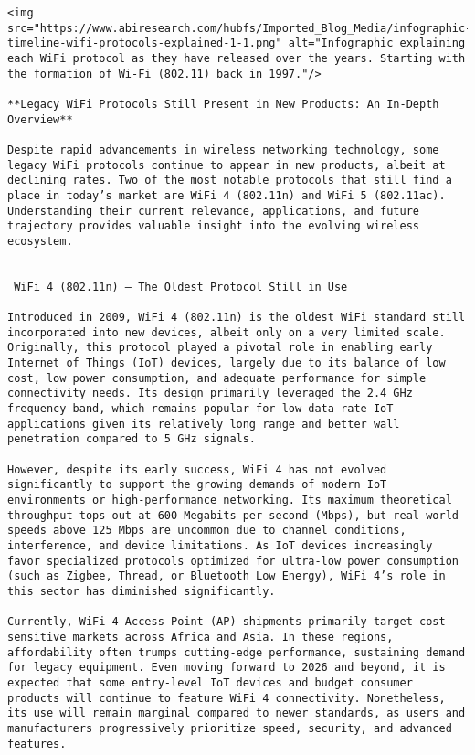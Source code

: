 \begin{verbatim}
<img src="https://www.abiresearch.com/hubfs/Imported_Blog_Media/infographic-timeline-wifi-protocols-explained-1-1.png" alt="Infographic explaining each WiFi protocol as they have released over the years. Starting with the formation of Wi-Fi (802.11) back in 1997."/>

**Legacy WiFi Protocols Still Present in New Products: An In-Depth Overview**

Despite rapid advancements in wireless networking technology, some legacy WiFi protocols continue to appear in new products, albeit at declining rates. Two of the most notable protocols that still find a place in today’s market are WiFi 4 (802.11n) and WiFi 5 (802.11ac). Understanding their current relevance, applications, and future trajectory provides valuable insight into the evolving wireless ecosystem.


 WiFi 4 (802.11n) – The Oldest Protocol Still in Use

Introduced in 2009, WiFi 4 (802.11n) is the oldest WiFi standard still incorporated into new devices, albeit only on a very limited scale. Originally, this protocol played a pivotal role in enabling early Internet of Things (IoT) devices, largely due to its balance of low cost, low power consumption, and adequate performance for simple connectivity needs. Its design primarily leveraged the 2.4 GHz frequency band, which remains popular for low-data-rate IoT applications given its relatively long range and better wall penetration compared to 5 GHz signals.

However, despite its early success, WiFi 4 has not evolved significantly to support the growing demands of modern IoT environments or high-performance networking. Its maximum theoretical throughput tops out at 600 Megabits per second (Mbps), but real-world speeds above 125 Mbps are uncommon due to channel conditions, interference, and device limitations. As IoT devices increasingly favor specialized protocols optimized for ultra-low power consumption (such as Zigbee, Thread, or Bluetooth Low Energy), WiFi 4’s role in this sector has diminished significantly.

Currently, WiFi 4 Access Point (AP) shipments primarily target cost-sensitive markets across Africa and Asia. In these regions, affordability often trumps cutting-edge performance, sustaining demand for legacy equipment. Even moving forward to 2026 and beyond, it is expected that some entry-level IoT devices and budget consumer products will continue to feature WiFi 4 connectivity. Nonetheless, its use will remain marginal compared to newer standards, as users and manufacturers progressively prioritize speed, security, and advanced features.



\end{verbatim}
